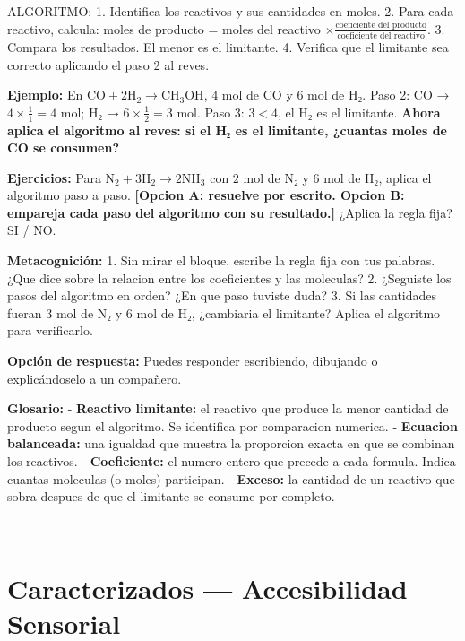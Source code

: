 \documentclass[
  spanish,
  letterpaper,
  12pt,
  oneside,
  open=any]{scrbook}
\newcommand{\setcolorsection}[2]{%
  \definecolor{currentsectionbg}{HTML}{#1}%
  \definecolor{currentsectionborder}{HTML}{#2}%
}
\begin{document}
ALGORITMO: 1. Identifica los reactivos y sus cantidades en moles. 2.
Para cada reactivo, calcula: moles de producto = moles del reactivo
\(\times \frac{\text{coeficiente del producto}}{\text{coeficiente del reactivo}}\).
3. Compara los resultados. El menor es el limitante. 4. Verifica que el
limitante sea correcto aplicando el paso 2 al reves.

\textbf{Ejemplo:} En
\(\text{CO} + 2\text{H}_2 \rightarrow \text{CH}_3\text{OH}\), \(4\) mol
de CO y \(6\) mol de H₂. Paso 2: CO → \(4 \times \frac{1}{1} = 4\) mol;
H₂ → \(6 \times \frac{1}{2} = 3\) mol. Paso 3: \(3 < 4\), el H₂ es el
limitante. \textbf{Ahora aplica el algoritmo al reves: si el H₂ es el
limitante, ¿cuantas moles de CO se consumen?}

\textbf{Ejercicios:} Para
\(\text{N}_2 + 3\text{H}_2 \rightarrow 2\text{NH}_3\) con \(2\) mol de
N₂ y \(6\) mol de H₂, aplica el algoritmo paso a paso. \textbf{{[}Opcion
A: resuelve por escrito. Opcion B: empareja cada paso del algoritmo con
su resultado.{]}} ¿Aplica la regla fija? SI / NO.

\textbf{Metacognición:} 1. Sin mirar el bloque, escribe la regla fija
con tus palabras. ¿Que dice sobre la relacion entre los coeficientes y
las moleculas? 2. ¿Seguiste los pasos del algoritmo en orden? ¿En que
paso tuviste duda? 3. Si las cantidades fueran \(3\) mol de N₂ y \(6\)
mol de H₂, ¿cambiaria el limitante? Aplica el algoritmo para
verificarlo.

\textbf{Opción de respuesta:} Puedes responder escribiendo, dibujando o
explicándoselo a un compañero.

\textbf{Glosario:} - \textbf{Reactivo limitante:} el reactivo que
produce la menor cantidad de producto segun el algoritmo. Se identifica
por comparacion numerica. - \textbf{Ecuacion balanceada:} una igualdad
que muestra la proporcion exacta en que se combinan los reactivos. -
\textbf{Coeficiente:} el numero entero que precede a cada formula.
Indica cuantas moleculas (o moles) participan. - \textbf{Exceso:} la
cantidad de un reactivo que sobra despues de que el limitante se consume
por completo.

\(\underline{\hspace{6cm}}\)

\setcolorsection{d6c7e7}{c0b0d8}

\section{Caracterizados --- Accesibilidad
Sensorial}\label{caracterizados-accesibilidad-sensorial}
\end{document}
